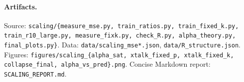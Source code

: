 \documentclass[11pt]{article}
\begin{document}
\paragraph{Artifacts.}
Source: \texttt{scaling/\{measure\_mse.py, train\_ratios.py,
train\_fixed\_k.py, train\_r10\_large.py, measure\_fixk.py, check\_R.py,
alpha\_theory.py, final\_plots.py\}}. Data:
\texttt{data/scaling\_mse*.json}, \texttt{data/R\_structure.json}.
Figures: \texttt{figures/scaling\_\{alpha\_sat, xtalk\_fixed\_p,
xtalk\_fixed\_k, collapse\_final, alpha\_vs\_pred\}.png}. Concise
Markdown report: \texttt{SCALING\_REPORT.md}.
\end{document}
